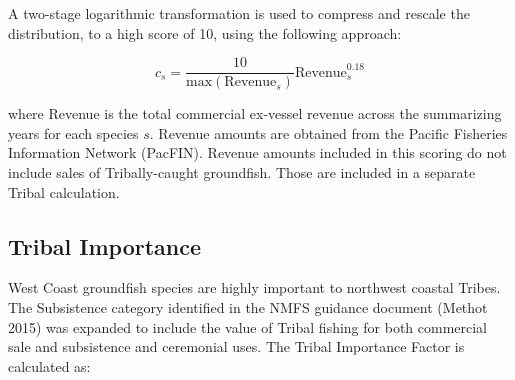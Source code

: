 \documentclass[11pt,
  english,
  a4paper,
]{article}
\begin{document}
\leavevmode\tagmcend\tagstructend\par


A two-stage logarithmic transformation is used to compress and rescale the distribution, to a high score of 10, using the following approach:

\leavevmode\tagmcend\tagstructend\par


\begin{equation}
  c_{s} = \frac{10}{\text{max}(\text{Revenue}_s)}\text{Revenue}_s^{0.18} 
\end{equation}

\leavevmode\tagmcend\tagstructend\par


where Revenue is the total commercial ex-vessel revenue across the summarizing years for each species {\(s\)\leavevmode\tagmcend\tagstructend}. Revenue amounts are obtained from the Pacific Fisheries Information Network (PacFIN). Revenue amounts included in this scoring do not include sales of Tribally-caught groundfish. Those are included in a separate Tribal calculation.

\leavevmode\tagmcend\tagstructend\par


\hypertarget{tribal-importance}{%
\subsection{Tribal Importance}\label{tribal-importance}}

\leavevmode\tagmcend\tagstructend


West Coast groundfish species are highly important to northwest coastal Tribes. The Subsistence category identified in the NMFS guidance document {(Methot 2015)\leavevmode\tagmcend\tagstructend} was expanded to include the value of Tribal fishing for both commercial sale and subsistence and ceremonial uses. The Tribal Importance Factor is calculated as:

\leavevmode\tagmcend\tagstructend\par
\end{document}
